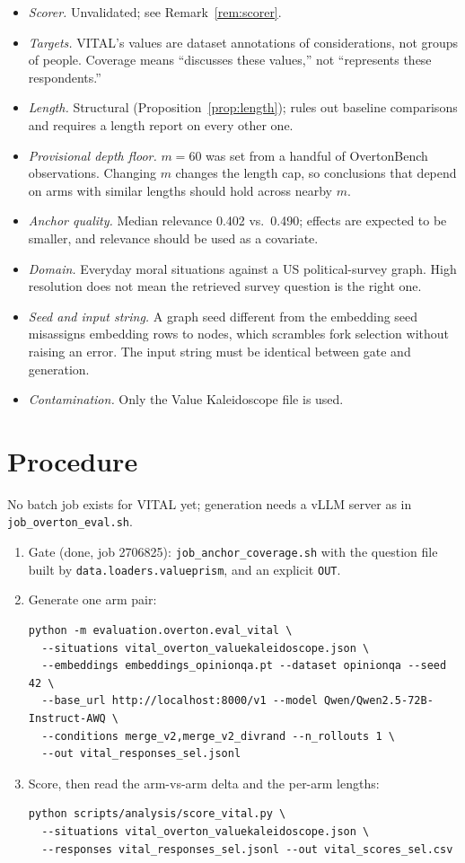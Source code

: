 \documentclass[11pt]{article}
\theoremstyle{definition}
\newcommand{\1}{\mathbf{1}}
\begin{document}
\begin{itemize}
  \item \emph{Scorer.} Unvalidated; see Remark~\ref{rem:scorer}.
  \item \emph{Targets.} VITAL's values are dataset annotations of considerations,
    not groups of people. Coverage means ``discusses these values,'' not
    ``represents these respondents.''
  \item \emph{Length.} Structural (Proposition~\ref{prop:length}); rules out
    baseline comparisons and requires a length report on every other one.
  \item \emph{Provisional depth floor.} $m = 60$ was set from a handful of
    OvertonBench observations. Changing $m$ changes the length cap, so conclusions
    that depend on arms with similar lengths should hold across nearby $m$.
  \item \emph{Anchor quality.} Median relevance 0.402 vs.\ 0.490; effects are
    expected to be smaller, and relevance should be used as a covariate.
  \item \emph{Domain.} Everyday moral situations against a US political-survey
    graph. High resolution does not mean the retrieved survey question is the
    right one.
  \item \emph{Seed and input string.} A graph seed different from the embedding
    seed misassigns embedding rows to nodes, which scrambles fork selection
    without raising an error. The input string must be identical between gate
    and generation.
  \item \emph{Contamination.} Only the Value Kaleidoscope file is used.
\end{itemize}

\section{Procedure}

No batch job exists for VITAL yet; generation needs a vLLM server as in
\texttt{job\_overton\_eval.sh}.

\begin{enumerate}
  \item Gate (done, job 2706825): \texttt{job\_anchor\_coverage.sh} with the
    question file built by \texttt{data.loaders.valueprism}, and an explicit
    \texttt{OUT}.
  \item Generate one arm pair:
\begin{verbatim}
python -m evaluation.overton.eval_vital \
  --situations vital_overton_valuekaleidoscope.json \
  --embeddings embeddings_opinionqa.pt --dataset opinionqa --seed 42 \
  --base_url http://localhost:8000/v1 --model Qwen/Qwen2.5-72B-Instruct-AWQ \
  --conditions merge_v2,merge_v2_divrand --n_rollouts 1 \
  --out vital_responses_sel.jsonl
\end{verbatim}
  \item Score, then read the arm-vs-arm delta and the per-arm lengths:
\begin{verbatim}
python scripts/analysis/score_vital.py \
  --situations vital_overton_valuekaleidoscope.json \
  --responses vital_responses_sel.jsonl --out vital_scores_sel.csv
\end{verbatim}
\end{enumerate}
\end{document}
